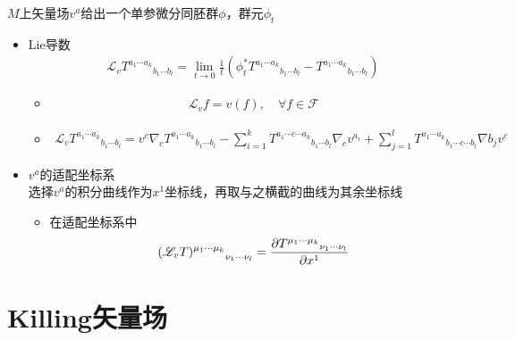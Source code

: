 $M$上矢量场$v^a$给出一个单参微分同胚群$\phi$，群元$\phi_t$
\begin{itemize}
    \item Lie导数
    \begin{gather*}
        \mathscr{L}_v {T^{a_1 \cdots a_k}}_{b_1 \cdots b_l}=\lim_{t \to 0} \frac{1}{t}(\phi_t^{*} {T^{a_1 \cdots a_k}}_{b_1 \cdots b_l} - {T^{a_1 \cdots a_k}}_{b_1 \cdots b_l})
    \end{gather*}
    \begin{itemize}
        \item \begin{gather*}
            \mathscr{L}_v f= v(f),\quad \forall f \in \mathscr{F}
        \end{gather*}
        \item \begin{gather*}
            \mathscr{L}_v {T^{a_1 \cdots a_k}}_{b_1 \cdots b_l}=v^c \nabla_c {T^{a_1 \cdots a_k}}_{b_1 \cdots b_l}-\displaystyle \sum_{i=1}^{k} {T^{a_1 \cdots c \cdots a_k}}_{b_1 \cdots b_l} \nabla_c v^{a_i}+\displaystyle \sum_{j=1}^{l} {T^{a_1 \cdots a_k}}_{b_1 \cdots c \cdots b_l} \nabla b_j v^c
        \end{gather*}
    \end{itemize}
    \item $v^a$的适配坐标系\\
    选择$v^a$的积分曲线作为$x^1$坐标线，再取与之横截的曲线为其余坐标线
    \begin{itemize}
        \item 在适配坐标系中
        \begin{gather*}
            {(\mathscr{L}_v T)^{\mu_1 \cdots \mu_k}}_{\nu_1 \cdots \nu_l}=\frac{\partial {T^{\mu_1 \cdots \mu_k}}_{\nu_1 \cdots \nu_l}}{\partial x^1}
        \end{gather*}
    \end{itemize}
\end{itemize}

\section{Killing矢量场}

